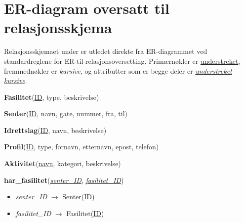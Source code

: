 \section{ER-diagram oversatt til relasjonsskjema}

Relasjonsskjemaet under er utledet direkte fra ER-diagrammet ved
standardreglene for ER-til-relasjonsoversetting.
Primærnøkler er \underline{understreket}, fremmednøkler er \textit{kursive},
og attributter som er begge deler er \underline{\textit{understreket kursive}}.

\newcommand{\pk}[1]{\underline{#1}}
\newcommand{\fk}[1]{\textit{#1}}
\newcommand{\pkfk}[1]{\underline{\textit{#1}}}

\newcommand{\rel}[2]{\noindent\textbf{#1}(#2)}
\newenvironment{fklist}{%
  \begin{itemize}[noitemsep, topsep=1pt, leftmargin=1.5em, label={$\bullet$}]%
}{%
  \end{itemize}\vspace{6pt}%
}

\vspace{4pt}

\rel{Fasilitet}{\pk{ID}, type, beskrivelse}

\vspace{6pt}

\rel{Senter}{\pk{ID}, navn, gate, nummer, fra, til}

\vspace{6pt}

\rel{Idrettslag}{\pk{ID}, navn, beskrivelse}

\vspace{6pt}

\rel{Profil}{\pk{ID}, type, fornavn, etternavn, epost, telefon}

\vspace{6pt}

\rel{Aktivitet}{\pk{navn}, kategori, beskrivelse}

\vspace{10pt}

\rel{har\_fasilitet}{\pkfk{senter\_ID}, \pkfk{fasilitet\_ID}}
\begin{fklist}
  \item \fk{senter\_ID} $\rightarrow$ Senter(\pk{ID})
  \item \fk{fasilitet\_ID} $\rightarrow$ Fasilitet(\pk{ID})
\end{fklist}

